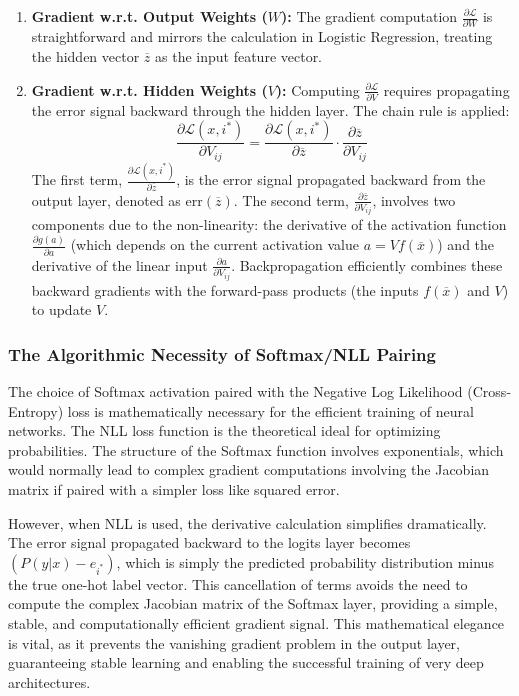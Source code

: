 \documentclass{article}
\begin{document}
\begin{enumerate}
    \item \textbf{Gradient w.r.t. Output Weights ($W$):} The gradient computation $\frac{\partial\mathcal{L}}{\partial W}$ is straightforward and mirrors the calculation in Logistic Regression, treating the hidden vector $\overline{z}$ as the input feature vector.
    \item \textbf{Gradient w.r.t. Hidden Weights ($V$):} Computing $\frac{\partial\mathcal{L}}{\partial V}$ requires propagating the error signal backward through the hidden layer. The chain rule is applied:
    $$\frac{\partial\mathcal{L}(x,i^{*})}{\partial V_{ij}}= \frac{\partial\mathcal{L}(x,i^{*})}{\partial \overline{z}} \cdot \frac{\partial \overline{z}}{\partial V_{ij}}$$
    The first term, $\frac{\partial\mathcal{L}(x,i^{*})}{\partial \overline{z}}$, is the error signal propagated backward from the output layer, denoted as $\text{err}(\overline{z})$. The second term, $\frac{\partial \overline{z}}{\partial V_{ij}}$, involves two components due to the non-linearity: the derivative of the activation function $\frac{\partial g(a)}{\partial a}$ (which depends on the current activation value $a=Vf(\overline{x})$) and the derivative of the linear input $\frac{\partial a}{\partial V_{ij}}$. Backpropagation efficiently combines these backward gradients with the forward-pass products (the inputs $f(\overline{x})$ and $V$) to update $V$.
\end{enumerate}

\subsubsection{The Algorithmic Necessity of Softmax/NLL Pairing}

The choice of Softmax activation paired with the Negative Log Likelihood (Cross-Entropy) loss is mathematically necessary for the efficient training of neural networks. The NLL loss function is the theoretical ideal for optimizing probabilities. The structure of the Softmax function involves exponentials, which would normally lead to complex gradient computations involving the Jacobian matrix if paired with a simpler loss like squared error.

However, when NLL is used, the derivative calculation simplifies dramatically. The error signal propagated backward to the logits layer becomes $(P(y|x) - e_{i^*})$, which is simply the predicted probability distribution minus the true one-hot label vector. This cancellation of terms avoids the need to compute the complex Jacobian matrix of the Softmax layer, providing a simple, stable, and computationally efficient gradient signal. This mathematical elegance is vital, as it prevents the vanishing gradient problem in the output layer, guaranteeing stable learning and enabling the successful training of very deep architectures.
\end{document}
